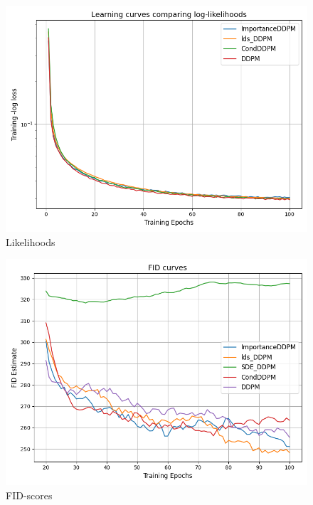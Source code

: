 \begin{figure}[H]
  \centering
  \includegraphics[width=0.9\linewidth]{./figures/loss.png}
  \caption{Likelihoods}
  \label{fig:ddpm:loss}
\end{figure}

\begin{figure}[H]
    \centering
    \includegraphics[width=0.9\linewidth]{./figures/FID.png}
    \caption{FID-scores}
    \label{fig:ddpm:fid}
\end{figure}

